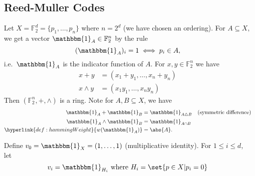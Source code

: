 \documentclass{article}
\newcommand{\F}{\mathbb{F}}
\newcommand{\1}[1]{\mathbbm{1}_{#1}}
\begin{document}
\color{black}
\subsection{Reed-Muller Codes}
Let $X = \F_2^d = \{p_1, \dotsc, p_n\}$ where $n = 2^d$ (we have chosen an ordering).
For $A \subseteq X$, we get a vector $\1{A} \in \F_2^n$ by the rule
\begin{equation*}
    (\1{A})_i = 1 \iff p_i \in A,
\end{equation*}
i.e.\ $\1{A}$ is the indicator function of $A$.
For $x, y \in \F_2^n$ we have
\begin{align*}
    x+y &= (x_1 + y_1, \dotsc, x_n + y_n) \\
    x \wedge y &= (x_1 y_1, \dotsc, x_n y_n)
\end{align*}
Then $(\F_2^n, +, \wedge)$ is a ring.
Note for $A, B \subseteq X$, we have
\begin{align*}
    \1{A} + \1{B} &= \1{A \bigtriangleup B} \quad \text{(symmetric difference)} \\
    \1{A} \wedge \1{B} &= \1{A \cap B} \\
    \hyperlink{def:hammingWeight}{w(\1{A})} &= \abs{A}.
\end{align*}

Define $v_0 = \1{X} = (1, \dotsc, 1)$ (multiplicative identity). For $1 \leq i \leq d$, let
\begin{equation*}
    v_i = \1{H_i} \text{ where } H_i = \set{p \in X | p_i = 0}
\end{equation*}
\end{document}
